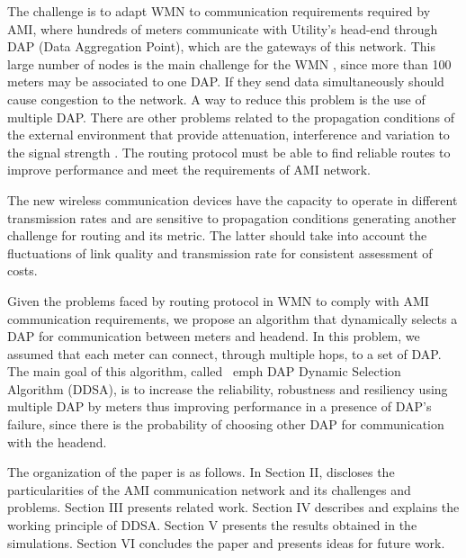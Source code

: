 \documentclass[conference]{IEEEtran}
\begin{document}
The challenge is to adapt WMN to communication requirements required by AMI, where hundreds of meters communicate with Utility's head-end through DAP (Data Aggregation Point), which are the gateways of this network. This large number of nodes is the main challenge for the WMN \cite{Akyildiz2005}, since more than 100 meters may be associated to one DAP. If they  send data simultaneously should cause congestion to the network. A way to reduce this problem is the use of multiple DAP. There are other problems related to the propagation conditions of the external environment that provide attenuation, interference and variation to the signal strength \cite{Gungor2011}. The routing protocol must be able to find reliable routes to improve performance and meet the requirements of AMI network.

The new wireless communication devices have the capacity to operate in different transmission rates and are sensitive to propagation conditions generating another challenge for routing and its metric. The latter should take into account the fluctuations of link quality and transmission
rate for consistent assessment of costs.

Given the problems faced by routing protocol in WMN to comply with AMI communication requirements, we propose an algorithm that dynamically selects a DAP for communication between meters and headend. In this problem, we assumed that each meter can connect, through multiple hops, to a set of DAP. The main goal of this algorithm, called \ emph {DAP} Dynamic Selection Algorithm (DDSA), is to increase the reliability, robustness and resiliency using multiple DAP by meters thus improving performance in a presence of DAP's failure, since there is the probability of choosing other DAP for communication with the headend.

The organization of the paper is as follows. In Section II, discloses the particularities of the AMI communication network and its challenges and problems. Section III presents related work. Section IV describes and explains the working principle of DDSA. Section V presents the results obtained in the simulations. Section VI concludes the paper and presents ideas for future work.


\end{document}
